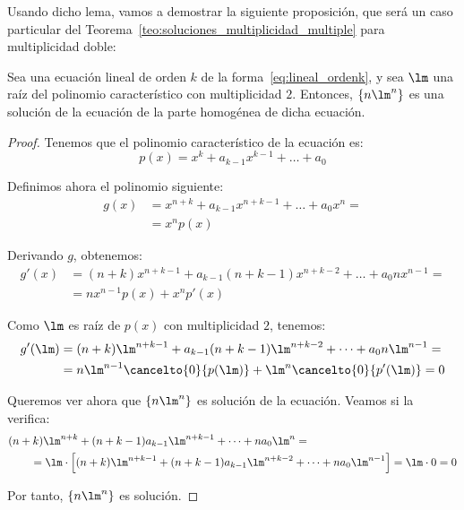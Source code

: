Usando dicho lema, vamos a demostrar la siguiente proposición, que será un caso particular del Teorema~\ref{teo:soluciones_multiplicidad_multiple} para multiplicidad doble:
\begin{prop}
    Sea una ecuación lineal de orden $k$ de la forma~\ref{eq:lineal_ordenk}, y sea $\lm$ una raíz del polinomio característico con multiplicidad $2$. Entonces, $\{n\lm^n\}$ es una solución de la ecuación de la parte homogénea de dicha ecuación.
    \begin{proof}
        Tenemos que el polinomio característico de la ecuación es:
        \begin{equation*}
            p(x)=x^k+a_{k-1}x^{k-1} + \ldots + a_0
        \end{equation*}
    
        Definimos ahora el polinomio siguiente:
        \begin{align*}
            g(x) &= x^{n+k} + a_{k-1}x^{n+k-1} + \dots + a_0x^n =\\&= x^np(x)
        \end{align*}
    
        Derivando $g$, obtenemos:
        \begin{align*}
            g'(x) &= (n+k)x^{n+k-1} + a_{k-1}(n+k-1)x^{n+k-2} + \dots + a_0nx^{n-1} =\\&= nx^{n-1}p(x) + x^np'(x)
        \end{align*}
    
        Como $\lm$ es raíz de $p(x)$ con multiplicidad $2$, tenemos:
        \begin{align*}
            g'(\lm)&=(n+k)\lm^{n+k-1} + a_{k-1}(n+k-1)\lm^{n+k-2} + \dots + a_0n\lm^{n-1} =\\&= n\lm^{n-1}\cancelto{0}{p(\lm)} + \lm^n\cancelto{0}{p'(\lm)} = 0
        \end{align*}
    
        Queremos ver ahora que $\{n\lm^n\}$ es solución de la ecuación. Veamos si la verifica:
        \begin{align*}
            &(n+k)\lm^{n+k} + (n+k-1)a_{k-1}\lm^{n+k-1} + \dots + na_0\lm^{n}=\\
            &\qquad = \lm\cdot \left[(n+k)\lm^{n+k-1} + (n+k-1)a_{k-1}\lm^{n+k-2} + \dots + na_0\lm^{n-1}\right]
            = \lm \cdot 0 = 0
        \end{align*}
    
        Por tanto, $\{n\lm^n\}$ es solución.
    \end{proof}
\end{prop}

